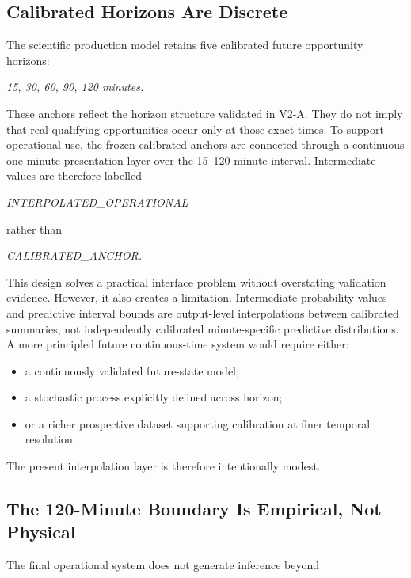 \subsection{Calibrated Horizons Are Discrete}
The scientific production model retains five calibrated future opportunity horizons:

\begin{center}\textit{15, 30, 60, 90, 120 minutes.}\end{center}

These anchors reflect the horizon structure validated in V2-A. They do not imply that real qualifying opportunities occur only at those exact times. To support operational use, the frozen calibrated anchors are connected through a continuous one-minute presentation layer over the 15--120 minute interval. Intermediate values are therefore labelled

\begin{center}\textit{INTERPOLATED\_OPERATIONAL}\end{center}

rather than

\begin{center}\textit{CALIBRATED\_ANCHOR.}\end{center}

This design solves a practical interface problem without overstating validation evidence. However, it also creates a limitation. Intermediate probability values and predictive interval bounds are output-level interpolations between calibrated summaries, not independently calibrated minute-specific predictive distributions. A more principled future continuous-time system would require either:

\begin{itemize}
\item a continuously validated future-state model;
\item a stochastic process explicitly defined across horizon;
\item or a richer prospective dataset supporting calibration at finer temporal resolution.
\end{itemize}

The present interpolation layer is therefore intentionally modest.

\subsection{The 120-Minute Boundary Is Empirical, Not Physical}
The final operational system does not generate inference beyond

